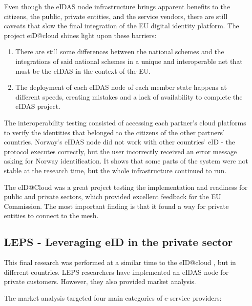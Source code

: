 Even though the eIDAS node infrastructure brings apparent benefits to the citizens, the public, private entities, and the service vendors, there are still caveats that slow the final integration of the EU digital identity platform. The project eiD@cloud shines light upon these barriers:

\begin{enumerate}
    \item There are still some differences between the national schemes and the integrations of said national schemes in a unique and interoperable net that must be the eIDAS in the context of the EU.
    \item The deployment of each eIDAS node of each member state happens at different speeds, creating mistakes and a lack of availability to complete the eIDAS project. 
\end{enumerate}

The interoperability testing consisted of accessing each partner's cloud platforms to verify the identities that belonged to the citizens of the other partners' countries. Norway's eIDAS node did not work with other countries' eID - the protocol executes correctly, but the user incorrectly received an error message asking for Norway identification. It shows that some parts of the system were not stable at the research time, but the whole infrastructure continued to run.

The eID@Cloud was a great project testing the implementation and readiness for public and private sectors, which provided excellent feedback for the EU Commission. The most important finding is that it found a way for private entities to connect to the mesh.

\subsection{LEPS - Leveraging eID in the private sector}

This final research \cite{Martin2019303} was performed at a similar time to the eID@cloud \cite{guerola2019eid}, but in different countries. LEPS researchers 
have implemented an eIDAS node for private customers. However, they also provided market analysis.

The market analysis targeted four main categories of e-service providers:

